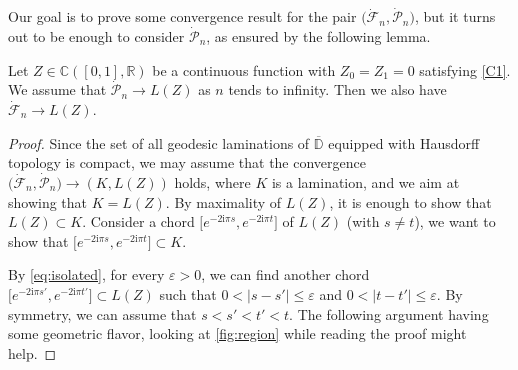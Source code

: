 \documentclass[AHL,XML,longabstracts,Unicode]{cedram}
\newcommand{\R}{\mathbb{R}}
\newcommand{\D}{\mathbb{D}}
\def\dFn{\dot{\mathcal{F}}_{n}}
\def\dPn{\dot{\mathcal{P}}_{n}}
\renewcommand{\epsilon}{\varepsilon}
\begin{document}
Our goal is to prove some convergence result for the pair $\big(\dFn , \dPn  \big)$,
but it turns out to be enough to consider
 $ \dPn$, as ensured by the following lemma.

 \begin{lemma}
 \label{lem:reduction_FtoK}
  Let $Z \in {\mathbb{C}}([0, 1], \R)$ be a continuous function with $Z_{0}=Z_{1}=0$ satisfying \ref{C1}.
  We assume that $\dPn \rightarrow   L(Z)$ as $n$ tends to infinity.
Then we also have  $\dFn \rightarrow   L(Z)$.
 \end{lemma}
\begin{proof}
Since the set of all geodesic laminations of $\overline{\D}$ equipped with Hausdorff topology is compact, we may assume that the convergence $\big( \dFn, \dPn  \big)   \rightarrow   (K,L(Z))$ holds, where $K$ is a lamination, and we aim at showing that $K=L(Z)$. By maximality of $L(Z)$, it is enough to show that $L(Z) \subset K$.
Consider a chord  $\big[e^{-2\textrm{i} \pi s},e^{-2\textrm{i} \pi t}\big]$ of $L(Z)$ (with $s \neq t$),
we want to show that $\big[e^{-2\textrm{i} \pi s},e^{-2\textrm{i} \pi t}\big] \subset K$.

By \eqref{eq:isolated}, for every $\epsilon>0$, we can find another chord  $\big[e^{-2\textrm{i} \pi s'},e^{-2\textrm{i} \pi t'}\big] \subset L(Z)$ such that  $0<|s-s'| \leq \epsilon$ and $0<|t-t'| \leq \epsilon$.
By symmetry, we can assume that  $s<s'<t'<t$.
The following argument having some geometric flavor,
looking at \cref{fig:region} while reading the proof might help.


\end{proof}
\end{document}
